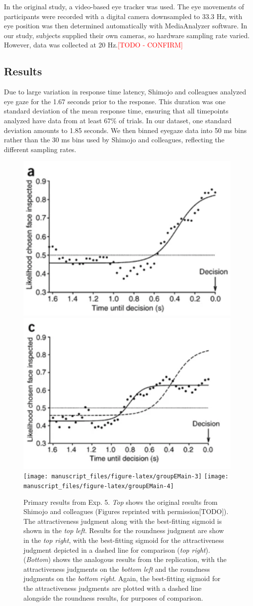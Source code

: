 \documentclass[
  man,floatsintext]{apa6}
\begin{document}
In the original study, a video-based eye tracker was used. The eye
movements of participants were recorded with a digital camera
downsampled to 33.3 Hz, with eye position was then determined
automatically with MediaAnalyzer software. In our study, subjects
supplied their own cameras, so hardware sampling rate varied. However,
data was collected at 20 Hz.\textcolor{red}{[TODO - CONFIRM]}

\hypertarget{results-4}{%
\subsection{Results}\label{results-4}}

Due to large variation in response time latency, Shimojo and colleagues analyzed eye gaze for the 1.67 seconds prior to the response. This duration was one standard deviation of the mean response time, ensuring that all timepoints analyzed have data from at least 67\% of trials. In our dataset, one standard deviation amounts to 1.85 seconds. We then binned eyegaze data into 50 ms bins rather than the 30 ms bins used by Shimojo and colleagues, reflecting the different sampling rates.



\begin{figure}
\includegraphics[width=0.45\linewidth]{figGroupEOrigA} \includegraphics[width=0.45\linewidth]{figGroupEOrigB} \texttt{[image: manuscript\_files/figure-latex/groupEMain-3]} \texttt{[image: manuscript\_files/figure-latex/groupEMain-4]} \caption{Primary results from Exp. 5. \emph{Top} shows the original results from Shimojo and colleagues (Figures reprinted with permission{[}TODO{]}). The attractiveness judgment along with the best-fitting sigmoid is shown in the \emph{top left}. Results for the roundness judgment are show in the \emph{top right}, with the best-fitting sigmoid for the attractiveness judgment depicted in a dashed line for comparison (\emph{top right}). (\emph{Bottom}) shows the analogous results from the replication, with the attractiveness judgments on the \emph{bottom left} and the roundness judgments on the \emph{bottom right}. Again, the best-fitting sigmoid for the attractiveness judgments are plotted with a dashed line alongside the roundness results, for purposes of comparison.}\label{fig:groupEMain}
\end{figure}
\end{document}
